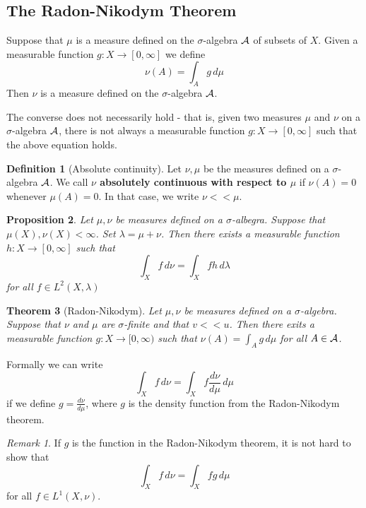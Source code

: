 \documentclass[10pt, oneside, reqno]{amsart}
\theoremstyle{plain}%
\newtheorem{thm}{Theorem}[section]
\newtheorem{prop}[thm]{Proposition}
\theoremstyle{definition}
\newtheorem{defn}[thm]{Definition}
\theoremstyle{remark}
\newtheorem*{rem}{Remark}
\newcommand{\dmu}{\, d \mu}
\begin{document}
\subsection{The Radon-Nikodym Theorem} %
\label{sub:the_radon_nikodym_theorem}
 Suppose that $\mu$ is a measure defined on the $\sigma$-algebra $\mathcal{A}$ of subsets of $X.$  Given a measurable function $g : X \rightarrow [0,\infty]$ we define \[
    \nu(A) = \int_A g \dmu
 \]
Then $\nu$ is a measure defined on the $\sigma$-algebra $\mathcal{A}$.

The converse does not necessarily hold - that is, given two measures $\mu$ and $\nu$ on a $\sigma$-algebra $\mathcal{A}$, there is not always a measurable function $g : X \rightarrow [0,\infty]$ such that the above equation holds.

\begin{defn}[Absolute continuity]
    Let $\nu, \mu$ be the measures defined on a $\sigma$-algebra $\mathcal{A}$. We call \textbf{$\nu$ absolutely continuous with respect to $\mu$} if $\nu(A) = 0$ whenever $\mu(A) = 0$.  In that case, we write $\nu << \mu$.
\end{defn}

\begin{prop}
    Let $\mu, \nu$ be measures defined on a $\sigma$-albegra.  Suppose that $\mu(X), \nu(X) < \infty$.  Set $\lambda = \mu + \nu$.  Then there exists a measurable function $h : X \rightarrow [0,\infty] $ such that \[
        \int_X f \, d \nu = \int_X f h \, d \lambda
    \] for all $f \in L^2(X, \lambda)$
\end{prop}

\begin{thm}[Radon-Nikodym]
    Let $\mu,\nu$ be measures defined on a $\sigma$-algebra.  Suppose that $\nu$ and $\mu$ are $\sigma$-finite and that $v << u$.  Then there exits a measurable function $g : X \rightarrow [0,\infty)$ such that $\nu(A) = \int_A g \dmu$ for all $A \in \mathcal{A}$. 
\end{thm}

Formally we can write \[
    \int_X f \, d \nu = \int_X f \frac{d \nu}{d\mu} \dmu
\] if we define $g = \frac{d \nu}{d\mu}$, where $g$ is the density function from the Radon-Nikodym theorem.

\begin{rem}
    If $g$ is the function in the Radon-Nikodym theorem, it is not hard to show that \[
        \int_X f \, d \nu = \int_X f g \dmu
    \] for all $f \in L^1(X, \nu)$.
\end{rem}
\end{document}
